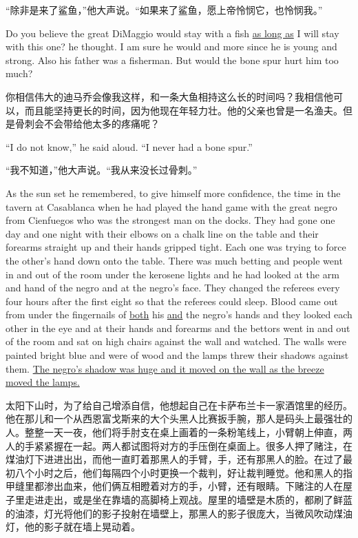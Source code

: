 \begin{paracol}{2}
“除非是来了鲨鱼，”他大声说。“如果来了鲨鱼，愿上帝怜悯它，也怜悯我。”

\switchcolumn*

Do you believe the great DiMaggio would stay with a fish \uline{as long as} I will
stay with this one? he thought. I am sure he would and more since he is
young and strong. Also his father was a fisherman. But would the bone spur
hurt him too much?

\switchcolumn

你相信伟大的迪马乔会像我这样，和一条大鱼相持这么长的时间吗？我相信他可以，而且能坚持更长的时间，因为他现在年轻力壮。他的父亲也曾是一名渔夫。但是骨刺会不会带给他太多的疼痛呢？

\switchcolumn*

``I do not know,'' he said aloud. ``I never had a bone spur.''

\switchcolumn

“我不知道，”他大声说。“我从来没长过骨刺。”

\switchcolumn*

As the sun set he remembered, to give himself more confidence, the time in
the \gls{tavern} at \gls{Casablanca} when he had played the hand game with
the great \gls{negro} from \gls{Cienfuegos} who was the strongest man on the
\glspl{dock}. They had gone one day and one night with their \glspl{elbow}
on a \gls{chalk} line on the table and their forearms straight up and their
hands gripped tight. Each one was trying to force the other's hand down onto
the table. There was much \gls{betting} and people went in and out of the
room under the \gls{kerosene} lights and he had looked at the arm and hand
of the negro and at the negro's face. They changed the \glspl{referee} every
four hours after the first eight so that the referees could sleep. Blood
came out from under the \glspl{fingernail} of \uline{both} his \uline{and}
the negro's hands and they looked each other in the eye and at their hands
and forearms and the \glspl{bettor} went in and out of the room and sat on
high chairs against the wall and watched. The walls were painted bright blue
and were of wood and the lamps \gls{threw} their shadows against them. \uline{The
negro's shadow was huge and it moved on the wall as the breeze moved the
lamps.}

\switchcolumn

太阳下山时，为了给自己增添自信，他想起自己在卡萨布兰卡一家酒馆里的经历。他在那儿和一个从西恩富戈斯来的大个头黑人比赛扳手腕，那人是码头上最强壮的人。整整一天一夜，他们将手肘支在桌上画着的一条粉笔线上，小臂朝上伸直，两人的手紧紧握在一起。两人都试图将对方的手压倒在桌面上。很多人押了赌注，在煤油灯下进进出出，而他一直盯着那黑人的手臂，手，还有那黑人的脸。在过了最初八个小时之后，他们每隔四个小时更换一个裁判，好让裁判睡觉。他和黑人的指甲缝里都渗出血来，他们俩互相瞪着对方的手，小臂，还有眼睛。下赌注的人在屋子里走进走出，或是坐在靠墙的高脚椅上观战。屋里的墙壁是木质的，都刷了鲜蓝的油漆，灯光将他们的影子投射在墙壁上，那黑人的影子很庞大，当微风吹动煤油灯，他的影子就在墙上晃动着。


\end{paracol}
